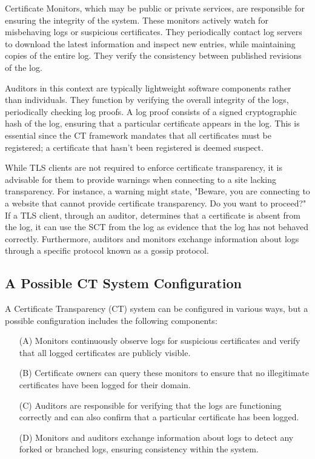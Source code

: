 Certificate Monitors, which may be public or private services, are
responsible for ensuring the integrity of the system. These monitors
actively watch for misbehaving logs or suspicious certificates. They
periodically contact log servers to download the latest information
and inspect new entries, while maintaining copies of the entire log.
They verify the consistency between published revisions of the log.

Auditors in this context are typically lightweight software components
rather than individuals. They function by verifying the overall
integrity of the logs, periodically checking log proofs. A log proof
consists of a signed cryptographic hash of the log, ensuring that a
particular certificate appears in the log. This is essential since the
CT framework mandates that all certificates must be registered; a
certificate that hasn't been registered is deemed suspect. 

While TLS clients are not required to enforce certificate
transparency, it is advisable for them to provide warnings when
connecting to a site lacking transparency. For instance, a warning
might state, "Beware, you are connecting to a website that cannot
provide certificate transparency. Do you want to proceed?" If a TLS
client, through an auditor, determines that a certificate is absent
from the log, it can use the SCT from the log as evidence that the log
has not behaved correctly. Furthermore, auditors and monitors exchange
information about logs through a specific protocol known as a gossip
protocol.

\subsection{A Possible CT System Configuration}

A Certificate Transparency (CT) system can be configured in various
ways, but a possible configuration includes the following components:

\begin{itemize}
    \item[(A)] Monitors continuously observe logs for suspicious
      certificates and verify that all logged certificates are
      publicly visible.
    \item[(B)] Certificate owners can query these monitors to ensure
      that no illegitimate certificates have been logged for their
      domain.
    \item[(C)] Auditors are responsible for verifying that the logs
      are functioning correctly and can also confirm that a particular
      certificate has been logged.
    \item[(D)] Monitors and auditors exchange information about logs
      to detect any forked or branched logs, ensuring consistency
      within the system.
\end{itemize}


